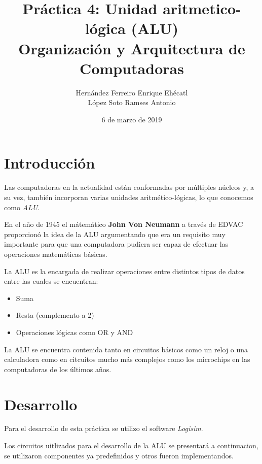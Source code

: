 \documentclass[12pt, letterpaper]{article}
\author{Hernández Ferreiro Enrique Ehécatl \\
          López Soto Ramses Antonio}
\title{Práctica 4: Unidad aritmetico-lógica (ALU) \\
                {\small Organización y Arquitectura de Computadoras}}
\date{6 de marzo de 2019}
\begin{document}
    \maketitle

    \section{Introducción}

      \hspace{.5cm}
      Las computadoras en la actualidad están conformadas por múltiples núcleos
      y, a su vez, también incorporan varias unidades aritmético-lógicas, lo que
       conocemos como \textit{ALU}.\vspace{.3cm}

      En el año de 1945 el mátemático \textbf{John Von Neumann} a través de EDVAC
      proporcionó la idea de la ALU argumentando que era un requisito muy
      importante para que una computadora pudiera ser capaz de efectuar las
      operaciones matemáticas básicas.\vspace{.3cm}

      La ALU es la encargada de realizar operaciones entre distintos tipos de
      datos entre las cuales se encuentran:

        \begin{itemize}
          \item Suma
          \item Resta (complemento a 2)
          \item Operaciones lógicas como OR y AND
        \end{itemize}

      La ALU se encuentra contenida tanto en circuitos básicos como un reloj o
      una calculadora como en citcuitos mucho más complejos como los microchips
      en las computadoras de los últimos años.\vspace{.3cm}

    \section{Desarrollo}

      \hspace{.5cm}
      Para el desarrollo de esta práctica se utilizo el software \textit{Logisim}.\vspace{.3cm}

      Los circuitos uitlizados para el desarrollo de la ALU se presentará a
      continuacion, se utilizaron componentes ya predefinidos y otros fueron
      implementandos.\vspace{.3cm}
\end{document}

